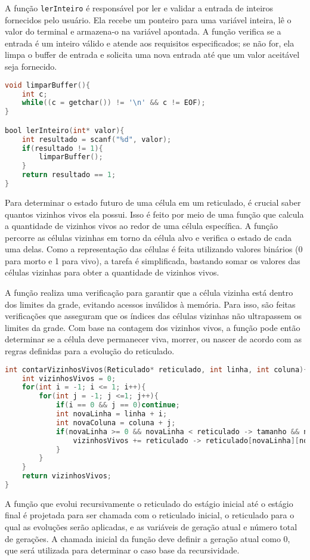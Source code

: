\documentclass{article}
\begin{document}
A função \verb|lerInteiro| é responsável por ler e validar a entrada de inteiros fornecidos pelo usuário. Ela recebe um ponteiro para uma variável inteira, lê o valor do terminal e armazena-o na variável apontada. A função verifica se a entrada é um inteiro válido e atende aos requisitos especificados; se não for, ela limpa o buffer de entrada e solicita uma nova entrada até que um valor aceitável seja fornecido. 
\begin{lstlisting}[caption={},label={lst:cod1},language=C]
void limparBuffer(){
    int c;
    while((c = getchar()) != '\n' && c != EOF);
}

bool lerInteiro(int* valor){
    int resultado = scanf("%d", valor);
    if(resultado != 1){
        limparBuffer();
    }
    return resultado == 1;
}
\end{lstlisting}
Para determinar o estado futuro de uma célula em um reticulado, é crucial saber quantos vizinhos vivos ela possui. Isso é feito por meio de uma função que calcula a quantidade de vizinhos vivos ao redor de uma célula específica. A função percorre as células vizinhas em torno da célula alvo e verifica o estado de cada uma delas. Como a representação das células é feita utilizando valores binários (0 para morto e 1 para vivo), a tarefa é simplificada, bastando somar os valores das células vizinhas para obter a quantidade de vizinhos vivos.

A função realiza uma verificação para garantir que a célula vizinha está dentro dos limites da grade, evitando acessos inválidos à memória. Para isso, são feitas verificações que asseguram que os índices das células vizinhas não ultrapassem os limites da grade. Com base na contagem dos vizinhos vivos, a função pode então determinar se a célula deve permanecer viva, morrer, ou nascer de acordo com as regras definidas para a evolução do reticulado.
 \begin{lstlisting}[caption={},label={lst:cod1},language=C]
 int contarVizinhosVivos(Reticulado* reticulado, int linha, int coluna){
    int vizinhosVivos = 0;
    for(int i = -1; i <= 1; i++){
        for(int j = -1; j <=1; j++){
            if(i == 0 && j == 0)continue;
            int novaLinha = linha + i;
            int novaColuna = coluna + j;
            if(novaLinha >= 0 && novaLinha < reticulado -> tamanho && novaColuna >= 0 && novaColuna < reticulado -> tamanho){
                vizinhosVivos += reticulado -> reticulado[novaLinha][novaColuna];
            }
        }
    }
    return vizinhosVivos;
}
\end{lstlisting}
A função que evolui recursivamente o reticulado do estágio inicial até o estágio final é projetada para ser chamada com o reticulado inicial, o reticulado para o qual as evoluções serão aplicadas, e as variáveis de geração atual e número total de gerações. A chamada inicial da função deve definir a geração atual como 0, que será utilizada para determinar o caso base da recursividade.
\end{document}
